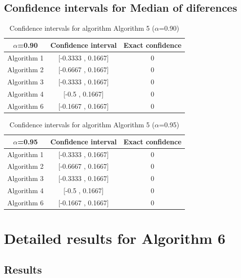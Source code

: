 \documentclass[a4paper,10pt]{article}
\begin{document}
\subsection{Confidence intervals for Median of diferences}

\begin{table}[!htp]
\centering\small
\begin{tabular}{
|c|c|c|}
\hline
 $\alpha$=0.90 & Confidence interval & Exact confidence \\ \hline 
Algorithm 1 & [-0.3333 , 0.1667] & 0\\ \hline 
Algorithm 2 & [-0.6667 , 0.1667] & 0\\ \hline 
Algorithm 3 & [-0.3333 , 0.1667] & 0\\ \hline 
Algorithm 4 & [-0.5 , 0.1667] & 0\\ \hline 
Algorithm 6 & [-0.1667 , 0.1667] & 0\\ \hline 

\end{tabular}
\caption{Confidence intervals for algorithm Algorithm 5 ($\alpha$=0.90)}
\end{table}
\begin{table}[!htp]
\centering\small
\begin{tabular}{
|c|c|c|}
\hline
 $\alpha$=0.95 & Confidence interval & Exact confidence \\ \hline 
Algorithm 1 & [-0.3333 , 0.1667] & 0\\ \hline 
Algorithm 2 & [-0.6667 , 0.1667] & 0\\ \hline 
Algorithm 3 & [-0.3333 , 0.1667] & 0\\ \hline 
Algorithm 4 & [-0.5 , 0.1667] & 0\\ \hline 
Algorithm 6 & [-0.1667 , 0.1667] & 0\\ \hline 

\end{tabular}
\caption{Confidence intervals for algorithm Algorithm 5 ($\alpha$=0.95)}
\end{table}

 \clearpage 


\section{Detailed results for Algorithm 6}


\subsection{Results}
\end{document}
